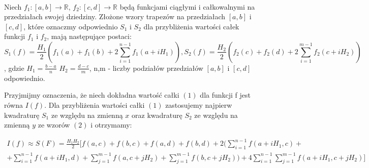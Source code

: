 \documentclass[a4paper,12pt]{article}
\begin{document}
\paragraph{ } Niech $f_1 : [a,b] \xrightarrow{} \mathbb{R}$, $f_2 : [c,d] \xrightarrow{} \mathbb{R}$ będą funkcjami ciągłymi i całkowalnymi na przedziałach swojej dziedziny. Złożone wzory trapezów na przedziałach $[a,b]$ i $[c,d]$, które oznaczmy odpowiednio $S_1$ i $S_2$ dla przybliżenia wartości całek funkcji $f_1$ i $f_2$, mają następujące postaci:
\noindent\begin{equation}
S_1(f) = \frac{H_1}{2}(f_1(a) + f_1(b) + 2\sum_{i=1}^{n-1} f_1(a+iH_1)),  
S_2(f) = \frac{H_2}{2}(f_2(c) + f_2(d) + 2\sum_{i=1}^{m-1} f_2(c+iH_2)) 
\end{equation}
, gdzie $H_1 = \frac{b-a}{n}$ $H_2 = \frac{d-c}{m}$, n,m - liczby podziałów przedziałów $[a,b]$ i $[c,d]$ odpowiednio.

Przyjmijmy oznaczenia, że niech dokładna wartość całki $(1)$ dla funkcji f jest równa $I(f)$. Dla przybliżenia wartości całki $(1)$ zastosujemy najpierw kwadraturę $S_1$ ze względu na zmienną $x$ oraz kwadraturę $S_2$ ze względu  na zmienną $y$ ze wzorów $(2)$ i otrzymamy:

\noindent\begin{gather}
I(f) \approx S(F) = \frac{H_1 H_2}{2}  \biggr[ f(a,c) + f(b,c) + f(a,d) + f(b,d) + 2\biggl(\sum_{i=1}^{n-1} f(a+iH_1,c) + \nonumber\\[1ex] + \sum_{i=1}^{n-1} f(a+iH_1,d) +  \sum_{j=1}^{m-1} f(a,c + jH_2) + 
 \sum_{j=1}^{m-1} f(b,c + jH_2)\biggl) + 4\sum_{i=1}^{n-1}\sum_{j=1}^{m-1}f(a+iH_1,c + jH_2)\biggr]\nonumber\
\end{gather}
\end{document}
